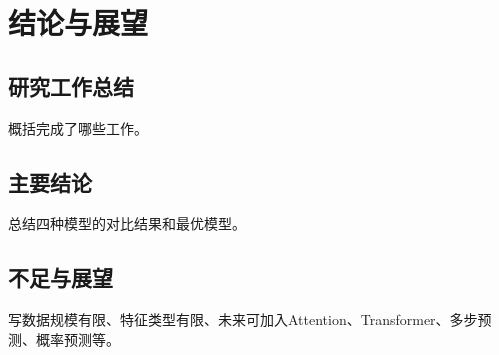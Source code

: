 \section{结论与展望}

\subsection{研究工作总结}
概括完成了哪些工作。

\subsection{主要结论}
总结四种模型的对比结果和最优模型。

\subsection{不足与展望}
写数据规模有限、特征类型有限、未来可加入Attention、Transformer、多步预测、概率预测等。
